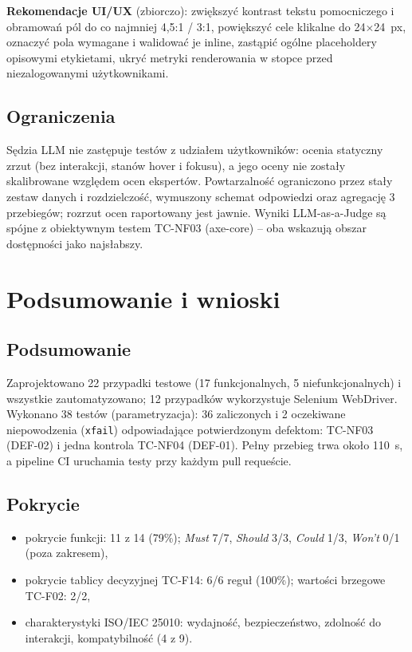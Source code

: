 \documentclass[11pt,a4paper]{article}
\begin{document}
\textbf{Rekomendacje UI/UX} (zbiorczo): zwiększyć kontrast tekstu pomocniczego i obramowań pól
do co najmniej 4,5:1 / 3:1, powiększyć cele klikalne do 24$\times$24~px, oznaczyć pola wymagane
i walidować je inline, zastąpić ogólne placeholdery opisowymi etykietami, ukryć metryki
renderowania w stopce przed niezalogowanymi użytkownikami.

\subsection{Ograniczenia}
Sędzia LLM nie zastępuje testów z udziałem użytkowników: ocenia statyczny zrzut (bez interakcji,
stanów hover i fokusu), a jego oceny nie zostały skalibrowane względem ocen ekspertów.
Powtarzalność ograniczono przez stały zestaw danych i rozdzielczość, wymuszony schemat odpowiedzi
oraz agregację 3 przebiegów; rozrzut ocen raportowany jest jawnie. Wyniki LLM-as-a-Judge są spójne
z obiektywnym testem TC-NF03 (axe-core) -- oba wskazują obszar dostępności jako najsłabszy.

\section{Podsumowanie i wnioski}

\subsection{Podsumowanie}
Zaprojektowano 22 przypadki testowe (17 funkcjonalnych, 5 niefunkcjonalnych) i wszystkie
zautomatyzowano; 12 przypadków wykorzystuje Selenium WebDriver. Wykonano 38 testów
(parametryzacja): 36 zaliczonych i 2 oczekiwane niepowodzenia (\texttt{xfail}) odpowiadające
potwierdzonym defektom: TC-NF03 (DEF-02) i jedna kontrola TC-NF04 (DEF-01). Pełny przebieg trwa około 110~s, a pipeline CI uruchamia testy przy każdym pull requeście.

\subsection{Pokrycie}
\begin{itemize}
  \item pokrycie funkcji: 11 z 14 (79\%); \emph{Must} 7/7, \emph{Should} 3/3, \emph{Could} 1/3,
        \emph{Won't} 0/1 (poza zakresem),
  \item pokrycie tablicy decyzyjnej TC-F14: 6/6 reguł (100\%); wartości brzegowe TC-F02: 2/2,
  \item charakterystyki ISO/IEC 25010: wydajność, bezpieczeństwo, zdolność do interakcji,
        kompatybilność (4 z 9).
\end{itemize}
\end{document}

